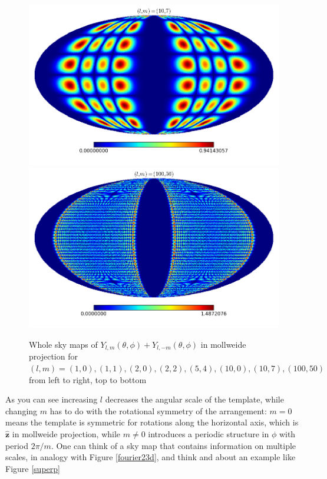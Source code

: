 \documentclass[11pt, a4paper,oneside,openright]{book}
\numberwithin{equation}{section}
\begin{document}
\begin{figure}
\begin{center}
\includegraphics[scale=0.3]{Fourier/(10,7).png}
\includegraphics[scale=0.3]{Fourier/(100,50).png}
\end{center}
\caption{Whole sky maps of $Y_{l,m}(\theta,\phi)+Y_{l,-m}(\theta ,\phi)$ in mollweide projection for $(l,m)=(1,0),(1,1),(2,0),(2,2),(5,4),(10,0),(10,7),(100,50)$ 
from left to right, top to bottom}
\label{sphharmonics}
\end{figure}
As you can see increasing $l$ decreases the angular scale of the template, while changing $m$ has to do with the rotational symmetry of the arrangement: $m=0$ means the template is symmetric for rotations along the horizontal axis, which is $\mathbf{\hat{z}}$ in mollweide projection, while $m\neq 0$ introduces a periodic structure in $\phi$ with period $2\pi/m$. One can think of a sky map that contains information on multiple scales, in analogy with Figure \ref{fourier23d}, and think and about an example like Figure \ref{superp}
\end{document}
